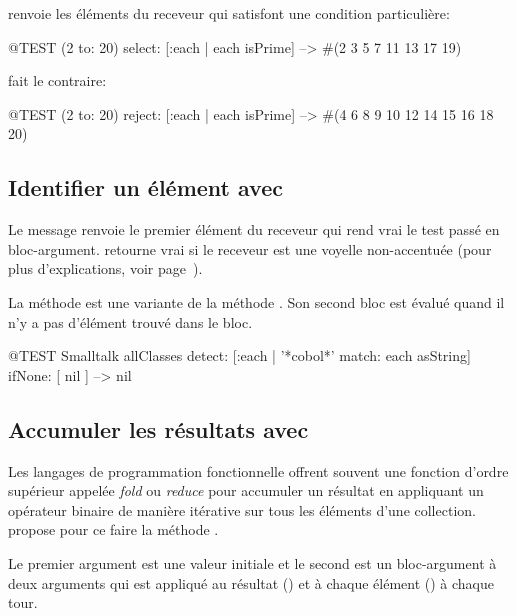 \documentclass[a4paper,10pt,twoside]{book}
\begin{document}
 renvoie les éléments du receveur qui satisfont
une condition particulière:

\begin{code}{@TEST}
(2 to: 20) select: [:each | each isPrime] --> #(2 3 5 7 11 13 17 19)
\end{code}

 fait le contraire:
\begin{code}{@TEST}
(2 to: 20) reject: [:each | each isPrime] --> #(4 6 8 9 10 12 14 15 16 18 20)
\end{code}

\subsection{Identifier un élément avec }

Le message  renvoie le premier
élément du receveur qui rend vrai le test passé en bloc-argument.
 retourne vrai \cad {} si le receveur est une
voyelle non-accentuée (pour plus d'explications, voir page~\pageref{def:isVowel}).

La méthode  est une variante de la méthode . 
Son second bloc est évalué quand il n'y a pas d'élément trouvé dans le bloc.

\begin{code}{@TEST}
Smalltalk allClasses detect: [:each | '*cobol*' match: each asString] ifNone: [ nil ] --> nil
\end{code} %

\subsection{Accumuler les résultats avec }
Les langages de programmation fonctionnelle offrent souvent une fonction d'ordre
supérieur appelée \emph{fold} ou \emph{reduce} pour accumuler un résultat
en appliquant un opérateur binaire de manière itérative sur tous les
éléments d'une collection.
\pharo propose pour ce faire la méthode .

Le premier argument est une valeur initiale et le second est un bloc-argument
à deux arguments qui est appliqué au résultat () et à chaque élément () à chaque tour.
\end{document}

